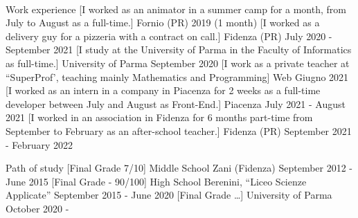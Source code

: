 \documentclass[]{llresume}
\begin{document}
\makeheader\
\begin{mainpane}
    \begin{mainsection}{Work experience}
            [I worked as an animator in a summer camp for a month, from July to August as a full-time.]
            {Fornio (PR)}
            {2019 (1 month)}
            [I worked as a delivery guy for a pizzeria with a contract on call.]
            {Fidenza (PR)}
            {July 2020 \-- September 2021}
            [I study at the University of Parma in the Faculty of Informatics as full-time.]
            {University of Parma}
            {September 2020}   
            [I work as a private teacher at ``SuperProf', teaching mainly Mathematics and Programming]
            {Web}
            {Giugno 2021}
            [I worked as an intern in a company in Piacenza for 2 weeks as a full-time developer between July and August as Front-End.]
            {Piacenza}
            {July 2021 \-- August 2021} 
            [I worked in an association in Fidenza for 6 months part-time from September to February as an after-school teacher.]
            {Fidenza (PR)}
            {September 2021 \-- February 2022}
    \end{mainsection}


    \begin{mainsection}{Path of study}
            [Final Grade 7/10]
            {Middle School Zani (Fidenza)}
            {September 2012 \-- June 2015}
            [Final Grade \-- 90/100]
            {High School Berenini,
            ``Liceo Scienze Applicate''}
            {September 2015 \-- June 2020}
            [Final Grade \dots]
            {University of Parma}
            {October 2020 \-- }
    \end{mainsection} 


\end{mainpane}
\end{document}
